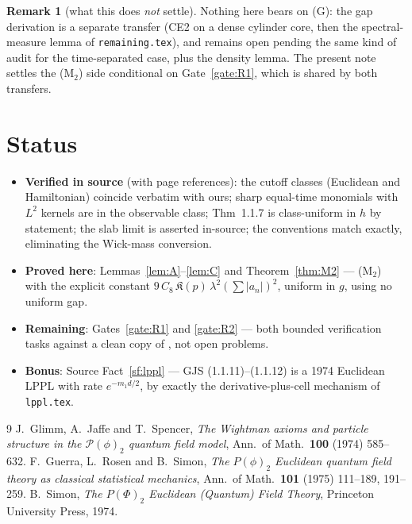 \documentclass[11pt,a4paper]{article}
\theoremstyle{plain}
\theoremstyle{definition}
\newtheorem{remark}[theorem]{Remark}
\begin{document}
\begin{remark}[what this does \emph{not} settle]
Nothing here bears on (G): the gap derivation is a separate transfer (CE2 on a dense cylinder
core, then the spectral-measure lemma of \texttt{remaining.tex}), and remains open pending the
same kind of audit for the time-separated case, plus the density lemma. The present note settles
the (M$_2$) side conditional on Gate~\ref{gate:R1}, which is shared by both transfers.
\end{remark}

\section{Status}

\begin{itemize}
\item \textbf{Verified in source} (with page references): the cutoff classes (Euclidean and
      Hamiltonian) coincide verbatim with ours; sharp equal-time monomials with $L^2$ kernels are
      in the observable class; Thm~1.1.7 is class-uniform in $h$ by statement; the slab limit is
      asserted in-source; the conventions match exactly, eliminating the Wick-mass conversion.
\item \textbf{Proved here}: Lemmas~\ref{lem:A}--\ref{lem:C} and Theorem~\ref{thm:M2} --- (M$_2$)
      with the explicit constant $9\,C_8\,\mathfrak K(p)\,\lambda^2(\sum|a_n|)^2$, uniform in
      $g$, using no uniform gap.
\item \textbf{Remaining}: Gates~\ref{gate:R1} and \ref{gate:R2} --- both bounded verification
      tasks against a clean copy of \cite{GJS}, not open problems.
\item \textbf{Bonus}: Source Fact~\ref{sf:lppl} --- GJS (1.1.11)--(1.1.12) is a 1974 Euclidean
      LPPL with rate $e^{-m_1d/2}$, by exactly the derivative-plus-cell mechanism of
      \texttt{lppl.tex}.
\end{itemize}

\begin{thebibliography}{9}
 J.~Glimm, A.~Jaffe and T.~Spencer, \emph{The Wightman axioms and particle structure
in the $\mathscr P(\phi)_2$ quantum field model}, Ann.\ of Math.\ \textbf{100} (1974) 585--632.
 F.~Guerra, L.~Rosen and B.~Simon, \emph{The $P(\phi)_2$ Euclidean quantum field
theory as classical statistical mechanics}, Ann.\ of Math.\ \textbf{101} (1975) 111--189, 191--259.
 B.~Simon, \emph{The $P(\Phi)_2$ Euclidean (Quantum) Field Theory}, Princeton
University Press, 1974.
\end{thebibliography}
\end{document}
